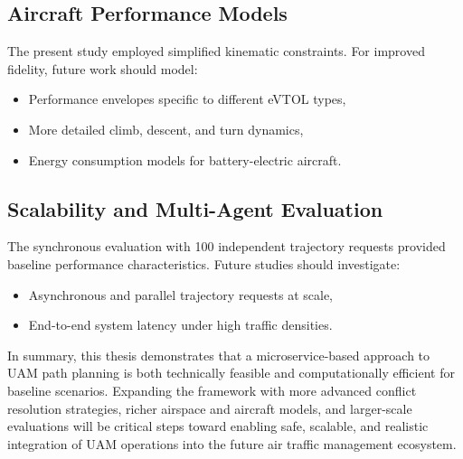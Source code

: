 \subsection*{Aircraft Performance Models}
The present study employed simplified kinematic constraints. For improved
fidelity, future work should model:
\begin{itemize}
    \item Performance envelopes specific to different eVTOL types,
    \item More detailed climb, descent, and turn dynamics,
    \item Energy consumption models for battery-electric aircraft.
\end{itemize}

\subsection*{Scalability and Multi-Agent Evaluation}
The synchronous evaluation with 100 independent trajectory requests provided
baseline performance characteristics. Future studies should investigate:
\begin{itemize}
    \item Asynchronous and parallel trajectory requests at scale,
    \item End-to-end system latency under high traffic densities.
\end{itemize}

\medskip
\noindent
In summary, this thesis demonstrates that a microservice-based approach to UAM
path planning is both technically feasible and computationally efficient for
baseline scenarios. Expanding the framework with more advanced conflict
resolution strategies, richer airspace and aircraft models, and larger-scale
evaluations will be critical steps toward enabling safe, scalable, and
realistic integration of UAM operations into the future air traffic management
ecosystem.
